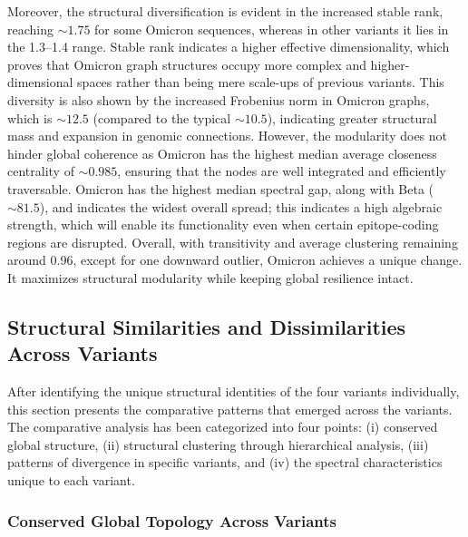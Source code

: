 \documentclass[conference]{IEEEtran}
\begin{document}
Moreover, the structural diversification is evident in the increased stable rank, reaching $\sim 1.75$ for some Omicron sequences, whereas in other variants it lies in the 1.3--1.4 range. Stable rank indicates a higher effective dimensionality, which proves that Omicron graph structures occupy more complex and higher-dimensional spaces rather than being mere scale-ups of previous variants. This diversity is also shown by the increased Frobenius norm in Omicron graphs, which is $\sim 12.5$ (compared to the typical $\sim 10.5$), indicating greater structural mass and expansion in genomic connections. However, the modularity does not hinder global coherence as Omicron has the highest median average closeness centrality of $\sim 0.985$, ensuring that the nodes are well integrated and efficiently traversable. Omicron has the highest median spectral gap, along with Beta ($\sim 81.5$), and indicates the widest overall spread; this indicates a high algebraic strength, which will enable its functionality even when certain epitope-coding regions are disrupted. Overall, with transitivity and average clustering remaining around 0.96, except for one downward outlier, Omicron achieves a unique change. It maximizes structural modularity while keeping global resilience intact.

\subsection{Structural Similarities and Dissimilarities Across Variants}

After identifying the unique structural identities of the four variants individually, this section presents the comparative patterns that emerged across the variants. The comparative analysis has been categorized into four points: (i) conserved global structure, (ii) structural clustering through hierarchical analysis, (iii) patterns of divergence in specific variants, and (iv) the spectral characteristics unique to each variant.

\subsubsection{Conserved Global Topology Across Variants}
\end{document}
